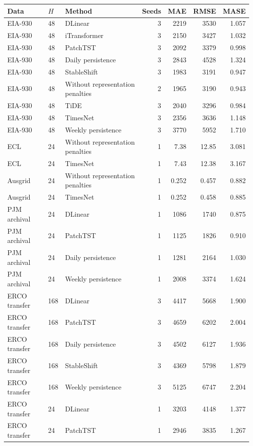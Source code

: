 {
\footnotesize
\begin{longtable}{llp{5.2cm}rrrr}
\toprule
Data & $H$ & Method & Seeds & MAE & RMSE & MASE \\
\midrule
\endhead
EIA-930 & 48 & DLinear & 3 & 2219 & 3530 & 1.057 \\
EIA-930 & 48 & iTransformer & 3 & 2150 & 3427 & 1.032 \\
EIA-930 & 48 & PatchTST & 3 & 2092 & 3379 & 0.998 \\
EIA-930 & 48 & Daily persistence & 3 & 2843 & 4528 & 1.324 \\
EIA-930 & 48 & StableShift & 3 & 1983 & 3191 & 0.947 \\
EIA-930 & 48 & Without representation penalties & 2 & 1965 & 3190 & 0.943 \\
EIA-930 & 48 & TiDE & 3 & 2040 & 3296 & 0.984 \\
EIA-930 & 48 & TimesNet & 3 & 2356 & 3636 & 1.148 \\
EIA-930 & 48 & Weekly persistence & 3 & 3770 & 5952 & 1.710 \\
ECL & 24 & Without representation penalties & 1 & 7.38 & 12.85 & 3.081 \\
ECL & 24 & TimesNet & 1 & 7.43 & 12.38 & 3.167 \\
Ausgrid & 24 & Without representation penalties & 1 & 0.252 & 0.457 & 0.882 \\
Ausgrid & 24 & TimesNet & 1 & 0.252 & 0.458 & 0.885 \\
PJM archival & 24 & DLinear & 1 & 1086 & 1740 & 0.875 \\
PJM archival & 24 & PatchTST & 1 & 1125 & 1826 & 0.910 \\
PJM archival & 24 & Daily persistence & 1 & 1281 & 2164 & 1.030 \\
PJM archival & 24 & Weekly persistence & 1 & 2008 & 3374 & 1.624 \\
ERCO transfer & 168 & DLinear & 3 & 4417 & 5668 & 1.900 \\
ERCO transfer & 168 & PatchTST & 3 & 4659 & 6202 & 2.004 \\
ERCO transfer & 168 & Daily persistence & 3 & 4502 & 6127 & 1.936 \\
ERCO transfer & 168 & StableShift & 3 & 4369 & 5798 & 1.879 \\
ERCO transfer & 168 & Weekly persistence & 3 & 5125 & 6747 & 2.204 \\
ERCO transfer & 24 & DLinear & 1 & 3203 & 4148 & 1.377 \\
ERCO transfer & 24 & PatchTST & 1 & 2946 & 3835 & 1.267 \\

\end{longtable}}
